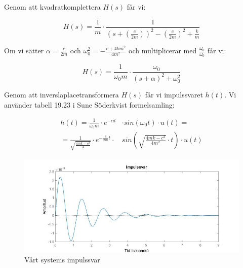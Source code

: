 \documentclass[10pt,a4paper]{article}
\begin{document}
Genom att kvadratkomplettera $H(s)$ får vi:

\begin{equation}
H(s) = \frac{1}{m} \cdot \frac{1}{(s+(\frac{c}{2  m}))^2-(\frac{c}{2  m})^2+\frac{k}{m}} 
\end{equation}

Om vi sätter $\alpha = \frac{c}{2m}$ och $\omega_0^2 = {-\frac{c + 4 k  m^2}{4  m^2}}$ och multiplicerar med $\frac{\omega_0}{\omega_0}$ får vi:

\begin{equation}
H(s) = \frac{1}{\omega_0  m} \cdot \frac{\omega_0}{(s + \alpha)^2 +\omega_0^2}
\end{equation}

Genom att inverslaplacetransformera $H(s)$ får vi impulssvaret $h(t)$. Vi använder tabell 19.23 i Sune Söderkvist formelsamling:

\begin{equation}
\begin{split}
h(t) = \frac{1}{\omega_0  m} \cdot  e^{-\alpha  t} & \cdot  sin(\omega_0  t) \cdot u(t) = \\ = \frac{1}{\sqrt{\frac{4  m  k - c^2}{4}} } \cdot  e^{-\frac{c}{2m} t} \cdot & sin(\sqrt{\frac{4  m  k - c^2}{4  m^2}} \cdot t) \cdot u(t)
\end{split}
\end{equation}



\begin{figure}[h]
\begin{center}

\includegraphics[scale=0.5]{Impulssvar}
\caption{Vårt systems impulssvar}
\end{center}
\end{figure}
\end{document}
